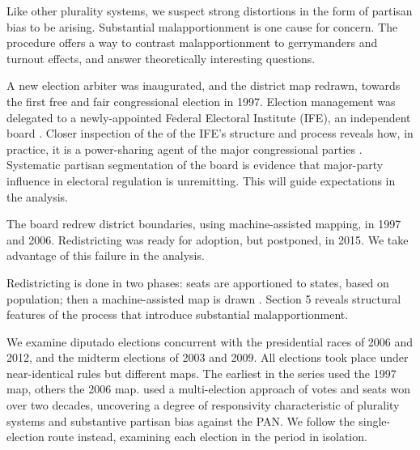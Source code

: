 \documentclass[letter,12pt]{article}
\begin{document}
Like other plurality systems, we suspect strong distortions in the form of partisan bias to be arising. Substantial malapportionment is one cause for concern. The procedure offers a way to contrast malapportionment to gerrymanders and turnout effects, and answer theoretically interesting questions. 

A new election arbiter was inaugurated, and the district map redrawn, towards the first free and fair congressional election in 1997. Election management was delegated to a newly-appointed Federal Electoral Institute (IFE), an independent board \citep{lujambio.vives.2008}. Closer inspection of the of the IFE's structure and process reveals how, in practice, it is a power-sharing agent of the major congressional parties \citep{estevez.magar.rosas.2008}. Systematic partisan segmentation of the board is evidence that major-party influence in electoral regulation is unremitting. This will guide expectations in the analysis.

The board redrew district boundaries, using machine-assisted mapping, in 1997 and 2006. Redistricting was ready for adoption, but postponed, in 2015. We take advantage of this failure in the analysis.

Redistricting is done in two phases: seats are apportioned to states, based on population; then a machine-assisted map is drawn \citep[][ describe and analyze the automated process]{altman.magar.mcd.trelles2014apsa,trelles.mtz.polygob2012}. Section 5 reveals structural features of the process that introduce substantial malapportionment. 

We examine diputado elections concurrent with the presidential races of 2006 and 2012, and the midterm elections of 2003 and 2009. All elections took place under near-identical rules but different maps. The earliest in the series used the 1997 map, others the 2006 map. \citet{marquez2014biasBlog} used a multi-election approach of votes and seats won over two decades, uncovering a degree of responsivity characteristic of plurality systems and substantive partisan bias against the PAN. We follow the single-election route instead, examining each election in the period in isolation.  
\end{document}
